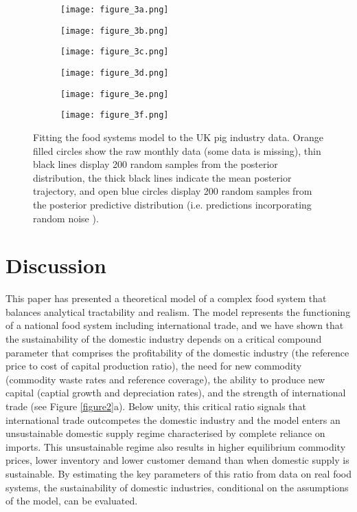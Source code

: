 \documentclass[12pt]{article}
\begin{document}
\begin{figure}[t!]
  \begin{subfigure}{0.5\textwidth}
    \texttt{[image: figure\_3a.png]}%
  \end{subfigure}%
  \begin{subfigure}{0.5\textwidth}
    \texttt{[image: figure\_3b.png]}
  \end{subfigure}

  \begin{subfigure}{0.5\textwidth}
    \texttt{[image: figure\_3c.png]}
  \end{subfigure}%
  \begin{subfigure}{0.5\textwidth}
    \texttt{[image: figure\_3d.png]}
  \end{subfigure}

  \begin{subfigure}{0.5\textwidth}
    \texttt{[image: figure\_3e.png]}
  \end{subfigure}%
  \begin{subfigure}{0.5\textwidth}
    \texttt{[image: figure\_3f.png]}
  \end{subfigure}
  \caption{Fitting the food systems model to the UK pig industry data. Orange filled circles show the raw monthly data (some data is missing), thin black lines display 200 random samples from the posterior distribution, the thick black lines indicate the mean posterior trajectory, and open blue circles display 200 random samples from the posterior predictive distribution (i.e. predictions incorporating random noise ).}
  \label{fig_posterior_predictions}
\end{figure}

\section{Discussion}
This paper has presented a theoretical model of a complex food system that balances analytical tractability and realism. The model represents the functioning of a national food system including international trade, and we have shown that the sustainability of the domestic industry depends on a critical compound parameter that comprises the profitability of the domestic industry (the reference price to cost of capital production ratio), the need for new commodity (commodity waste rates and reference coverage), the ability to produce new capital (captial growth and depreciation rates), and the strength of international trade (see Figure \ref{figure2}a). Below unity, this critical ratio signals that international trade outcompetes the domestic industry and the model enters an unsustainable domestic supply regime characterised by complete reliance on imports. This unsustainable regime also results in higher equilibrium commodity prices, lower inventory and lower customer demand than when domestic supply is sustainable. By estimating the key parameters of this ratio from data on real food systems, the sustainability of domestic industries, conditional on the assumptions of the model, can be evaluated.
\end{document}
